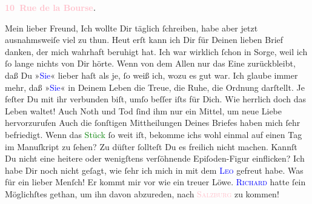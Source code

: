            \pstart
           \begin{otherlanguage}{french}\textcolor{gray}{\textbf{\textbf{\textcolor{pink}{10 Rue de la Bourse}{}\ledrightnote{\textcolor{pink}{rue de la Bourse}}.}}}\end{otherlanguage}\pend
           \pstart\center{}Mein lieber Freund,\pend\pstart
           Ich wollte Dir täglich ſchreiben, habe aber jetzt ausnahmsweiſe viel zu thun. Heut erſt kann ich Dir für Deinen lieben Brief danken,
               der mich wahrhaft beruhigt hat. Ich war wirklich ſchon in Sorge, weil ich ſo lange
               nichts \introOben{}von Dir\introOben{} hörte.\pend
           \pstart
           Wenn von dem Allen nur das Eine zurückbleibt, daß Du »\textcolor{blue}{Sie}{}« lieber haſt als je, ſo weiß ich, wozu
               es gut war. Ich glaube immer mehr, daß »\textcolor{blue}{Sie}{}« in Deinem Leben die Treue, die Ruhe, die Ordnung
               darſtellt. Je feſter Du mit ihr verbunden biſt, umſo beſſer iſts für Dich. Wie
               herrlich doch {\pb}das Leben waltet! Auch Noth und Tod
               ſind ihm nur ein Mittel, um neue Liebe hervorzurufen{\dotsfive}\pend
           \pstart
           Auch die ſonſtigen Mittheilungen Deines Briefes haben mich ſehr befriedigt. Wenn das
                  \textcolor{green}{Stück}{} ſo weit
               iſt, bekomme ichs wohl einmal auf einen Tag im Manuſkript zu ſehen? Zu düſter
               ſollteſt Du es freilich nicht machen. Kannſt Du nicht eine heitere oder wenigſtens
               verſöhnende Epiſoden-Figur einflicken?{\dotsfive}\pend
           \pstart
           Ich habe Dir noch nicht geſagt, wie ſehr ich mich in \textsc{\label{K_L02829-66v}\label{K_L02829-66h}} mit dem \textsc{\textcolor{blue}{Leo}{}\ledrightnote{\textcolor{blue}{Leo Van-Jung}}} gefreut habe. Was für ein lieber Menſch! Er kommt mir vor wie ein treuer Löwe.
                  {\pb}\textsc{\textcolor{blue}{Richard}{}\ledrightnote{\textcolor{blue}{Richard Beer-Hofmann}}} hatte ſein Möglichſtes gethan, um ihn davon abzureden, nach \textsc{\textcolor{pink}{Salzburg}{}\ledrightnote{\textcolor{pink}{Salzburg}}} zu kommen!\pend
